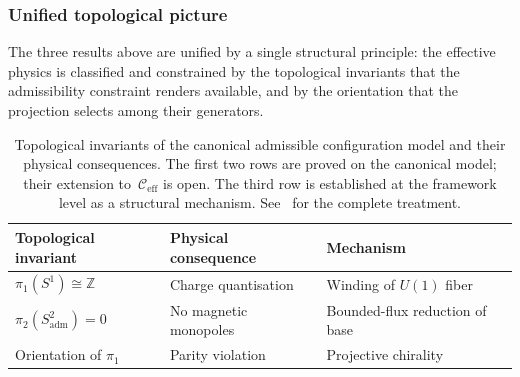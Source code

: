   \subsubsection*{Unified topological picture}
    \label{sec:topological-summary}

    The three results above are unified by a single structural principle: the
    effective physics is classified and constrained by the topological invariants
    that the admissibility constraint renders available, and by the orientation
    that the projection selects among their generators.

    \begin{table}[h]
      \centering
      \begin{tabular}{lll}
        \hline
        Topological invariant           & Physical consequence  & Mechanism                      \\
        \hline
        $\pi_1(S^1) \cong \mathbb{Z}$   & Charge quantisation   & Winding of $U(1)$ fiber        \\
        $\pi_2(S^2_{\mathrm{adm}}) = 0$ & No magnetic monopoles & Bounded-flux reduction of base \\
        Orientation of $\pi_1$          & Parity violation      & Projective chirality           \\
        \hline
      \end{tabular}
      \caption{Topological invariants of the canonical admissible configuration model
      and their physical consequences.
      The first two rows are proved on the canonical model; their extension
      to~$\mathcal{C}_{\mathrm{eff}}$ is open.
      The third row is established at the framework level as a structural mechanism.
      See~\cite{Beau2026k} for the complete treatment.}
      \label{tab:topological-invariants}
    \end{table}
